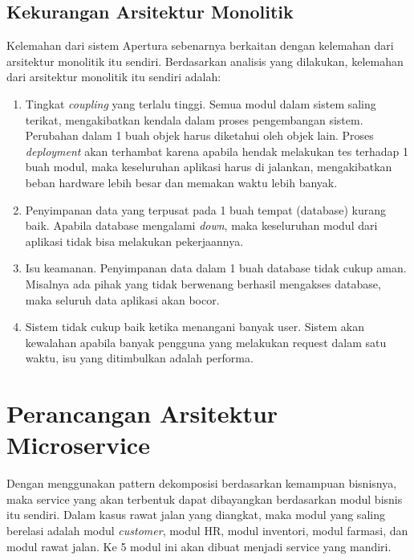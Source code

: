 \subsection{Kekurangan Arsitektur Monolitik}
Kelemahan dari sistem Apertura sebenarnya berkaitan dengan kelemahan dari arsitektur monolitik itu sendiri. Berdasarkan analisis yang dilakukan, kelemahan dari arsitektur monolitik itu sendiri adalah:

\begin{enumerate}[leftmargin=*]
	\item Tingkat \textit{coupling} yang terlalu tinggi. Semua modul dalam sistem saling terikat, mengakibatkan kendala dalam proses pengembangan sistem. Perubahan dalam 1 buah objek harus diketahui oleh objek lain. Proses \textit{deployment} akan terhambat karena apabila hendak melakukan tes terhadap 1 buah modul, maka keseluruhan aplikasi harus di jalankan, mengakibatkan beban hardware lebih besar dan memakan waktu lebih banyak.
	\item Penyimpanan data yang terpusat pada 1 buah tempat (database) kurang baik. Apabila database mengalami \textit{down}, maka keseluruhan modul dari aplikasi tidak bisa melakukan pekerjaannya.
	\item Isu keamanan. Penyimpanan data dalam 1 buah database tidak cukup aman. Misalnya ada pihak yang tidak berwenang berhasil mengakses database, maka seluruh data aplikasi akan bocor.
	\item Sistem tidak cukup baik ketika menangani banyak user. Sistem akan kewalahan apabila banyak pengguna yang melakukan request dalam satu waktu, isu yang ditimbulkan adalah performa.
\end{enumerate}

\section{Perancangan Arsitektur Microservice}
Dengan menggunakan pattern dekomposisi berdasarkan kemampuan bisnisnya, maka service yang akan terbentuk dapat dibayangkan berdasarkan modul bisnis itu sendiri. Dalam kasus rawat jalan yang diangkat, maka modul yang saling berelasi adalah modul \textit{customer}, modul HR, modul inventori, modul farmasi, dan modul rawat jalan. Ke 5 modul ini akan dibuat menjadi service yang mandiri.


